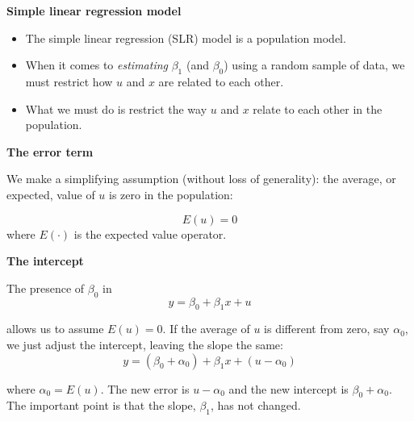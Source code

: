 \documentclass[notes=show]{beamer}
\begin{document}
\begin{frame}[plain]
\begin{center}
\textbf{Simple linear regression model}
\end{center}

\begin{itemize}
\item The simple linear regression (SLR) model is a population model. 
\item When it comes to \emph{estimating} $\beta _{1}$ (and $\beta _{0}$) using a random sample of data, we must restrict how $u$ and $x$ are related to each other.
\item What we must do is restrict the way $u$ and $x$ relate to each other in the population.
\end{itemize}
\end{frame}

\begin{frame}[plain]
\begin{center}
\textbf{The error term}
\end{center}

We make a simplifying assumption (without loss of generality): the average, or expected, value of $u$ is zero in the population:

 \begin{equation}
  E(u)=0
 \end{equation}
 where $E(\cdot )$ is the expected value operator.

\end{frame}

\begin{frame}[plain]
\begin{center}
\textbf{The intercept}
\end{center}
 The presence of $\beta _{0}$ in \begin{equation}
  y=\beta _{0}+\beta _{1}x+u
 \end{equation}
 
 allows us to assume $E(u)=0$. If the average of $u$ is different from zero, say $\alpha _{0}$, we just adjust the intercept, leaving the slope the same:\begin{equation}
  y=(\beta _{0}+\alpha _{0})+\beta _{1}x+(u-\alpha _{0})
 \end{equation}
 
 where $\alpha _{0}=E(u)$. The new error is $u-\alpha _{0}$ and the new intercept is $\beta _{0}+\alpha _{0}$. The important point is that the slope, $\beta _{1}$, has not changed.

\end{frame}
\end{document}

